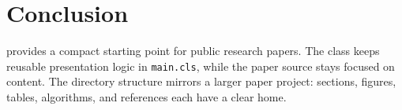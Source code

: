 \section{Conclusion}

\method provides a compact starting point for public research papers. The class
keeps reusable presentation logic in \texttt{main.cls}, while the paper
source stays focused on content. The directory structure mirrors a larger paper
project: sections, figures, tables, algorithms, and references each have a clear
home.


